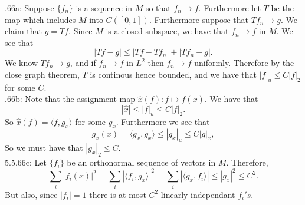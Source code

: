 \documentclass[letterpaper]{article}
\newcommand{\lan}{\langle}
\newcommand{\ran}{\rangle}
\newcommand{\inn}[1]{\lan#1\ran}
\begin{document}
 .66a: 
Suppose $\{f_n\}$ is a sequence in $M$ so that $f_n \to f$. Furthermore let $T$ be the map which includes $M$ into $C([0,1])$. 
Furthermore suppose that $Tf_n \to g$. We claim that $g = Tf$. Since $M$ is a closed subspace, we have that $f_n \to f$ in $M$. 
We see that $$|Tf- g| \leq |Tf - Tf_n| + |Tf_n - g|.$$ We know $Tf_n \to g$, and if $f_n \to f$ in $L^2$ then $f_n \to f$ uniformly. 
Therefore by the close graph theorem, $T$ is continous hence bounded, and we have that $|f|_u \leq C|f|_2$ for some $C$. 
\\ .66b: Note that the assignment map $\hat{x}(f) :f \mapsto f(x)$. We have that $$|\hat{x}| \leq |f|_u \leq C|f|_{2}.$$ So $\hat{x}(f) = \inn{f,g_x}$ for some $g_x$.
Furthermore we see that $$g_x(x) = \inn{g_x,g_x} \leq |g_x|_u \leq C|g|_x,$$ So we must have that $|g_x|_2 \leq C$.
\newline \\ 5.5.66c: Let $\{f_i\}$ be an orthonormal sequence of vectors in $M$. Therefore, 
$$\sum_{i} |f_i(x)|^2 = \sum_{i} |\inn{f_i,g_x}|^2 = \sum_{i} |\inn{g_x,f_i}| \leq |g_x|^2 \leq C^2.$$
But also, since $|f_i|=1$ there is at most $C^2$ linearly independant $f_i's$.  
\end{document}
